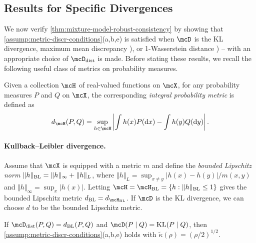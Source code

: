 \subsection{Results for Specific Divergences} \label{sec:divergence-choice}

We now verify \cref{thm:mixture-model-robust-consistency} by showing that  \cref{assump:metric-discr-conditions}(a,b,e) is satisfied when $\mcD$ is the  KL divergence, maximum mean discrepancy \citep[MMD; ][]{Sriperumbudur:2010}), or 1-Wasserstein distance \citep{Villani:2009}) -- with an appropriate choice of $\distDisc$ is made.
Before stating these results, we recall the following useful class of metrics on probability measures.
\begin{definition}
	Given a collection $\mcH$ of real-valued functions on $\mcX$,
	for any probability measures $P$ and $Q$ on $\mcX$,
	the corresponding \emph{integral probability metric} is defined as
	\[ \label{eq:IPM}
		d_{\mcH}(P,Q) = \sup_{h \in \mcH}\left|\int h(x)P(\dee x) - \int h(y) Q(\dee y)\right|.
	\]
\end{definition}
\paragraph{Kullback--Leibler divergence.}
Assume that $\mcX$ is equipped with a metric $m$ and define the \emph{bounded Lipschitz norm}
$\Vert h \Vert_{\mathrm{BL}} = \Vert h \Vert_{\infty} + \Vert h \Vert_{L}$, where $\Vert{h}\Vert_{L} = \sup_{x \ne y}|h(x) - h(y)|/m(x, y)$
and $\Vert{h}\Vert_{\infty} = \sup_{x} |h(x)|$.
Letting $\mcH = \mcH_{\mathrm{BL}} = \{h : \Vert h \Vert_{\mathrm{BL}}\le 1\}$ gives the bounded Lipschitz metric
$\blmetric = d_{\mcH_{\mathrm{BL}}}$.
If $\mcD$ is the KL divergence, we can choose $d$ to be the bounded Lipschitz metric.
\begin{proposition} 	\label{coro:KL}
	If $\distDisc(P, Q) = \blmetric(P,Q)$ and $\mcD(P \mid Q) = \kl{P}{Q}$, then
	\cref{assump:metric-discr-conditions}(a,b,e) holds with $\widetilde\kappa(\rho) = (\rho/2)^{1/2}$.
\end{proposition}

